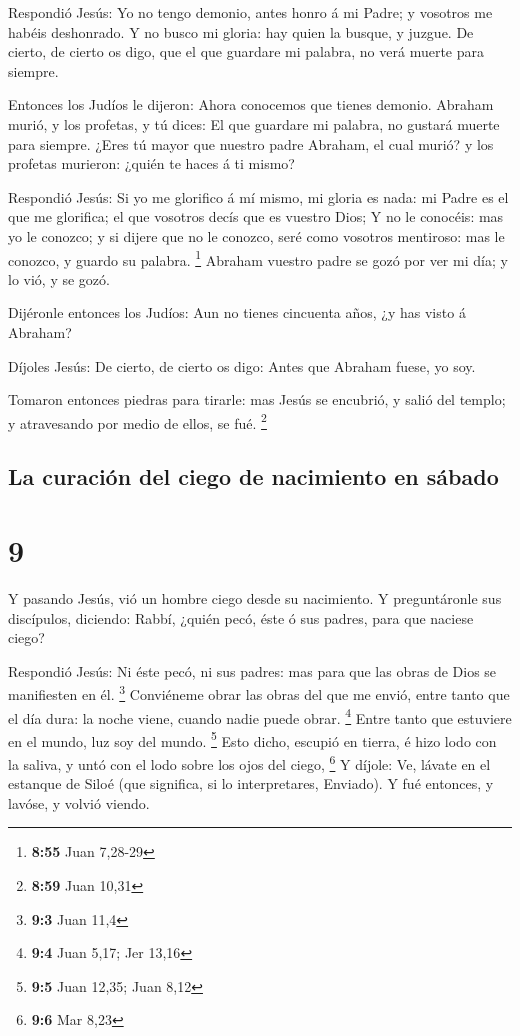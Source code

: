  Respondió Jesús: Yo no tengo demonio, antes honro á mi
Padre; y vosotros me habéis deshonrado.  Y no busco mi
gloria: hay quien la busque, y juzgue.  De cierto, de
cierto os digo, que el que guardare mi palabra, no verá muerte para
siempre.

 Entonces los Judíos le dijeron: Ahora conocemos que
tienes demonio. Abraham murió, y los profetas, y tú dices: El que
guardare mi palabra, no gustará muerte para siempre. 
¿Eres tú mayor que nuestro padre Abraham, el cual murió? y los profetas
murieron: ¿quién te haces á ti mismo?

 Respondió Jesús: Si yo me glorifico á mí mismo, mi
gloria es nada: mi Padre es el que me glorifica; el que vosotros decís
que es vuestro Dios;  Y no le conocéis: mas yo le
conozco; y si dijere que no le conozco, seré como vosotros mentiroso:
mas le conozco, y guardo su palabra. \footnote{\textbf{8:55} Juan
  7,28-29}  Abraham vuestro padre se gozó por ver mi día;
y lo vió, y se gozó.

 Dijéronle entonces los Judíos: Aun no tienes cincuenta
años, ¿y has visto á Abraham?

 Díjoles Jesús: De cierto, de cierto os digo: Antes que
Abraham fuese, yo soy.

 Tomaron entonces piedras para tirarle: mas Jesús se
encubrió, y salió del templo; y atravesando por medio de ellos, se fué.
\footnote{\textbf{8:59} Juan 10,31}

\hypertarget{la-curaciuxf3n-del-ciego-de-nacimiento-en-suxe1bado}{%
\subsection{La curación del ciego de nacimiento en
sábado}\label{la-curaciuxf3n-del-ciego-de-nacimiento-en-suxe1bado}}

\hypertarget{section-8}{%
\section{9}\label{section-8}}

 Y pasando Jesús, vió un hombre ciego desde su nacimiento.
 Y preguntáronle sus discípulos, diciendo: Rabbí, ¿quién
pecó, éste ó sus padres, para que naciese ciego?

 Respondió Jesús: Ni éste pecó, ni sus padres: mas para
que las obras de Dios se manifiesten en él. \footnote{\textbf{9:3} Juan
  11,4}  Conviéneme obrar las obras del que me envió,
entre tanto que el día dura: la noche viene, cuando nadie puede obrar.
\footnote{\textbf{9:4} Juan 5,17; Jer 13,16}  Entre tanto
que estuviere en el mundo, luz soy del mundo. \footnote{\textbf{9:5}
  Juan 12,35; Juan 8,12}  Esto dicho, escupió en tierra, é
hizo lodo con la saliva, y untó con el lodo sobre los ojos del ciego,
\footnote{\textbf{9:6} Mar 8,23}  Y díjole: Ve, lávate en
el estanque de Siloé (que significa, si lo interpretares, Enviado). Y
fué entonces, y lavóse, y volvió viendo.


